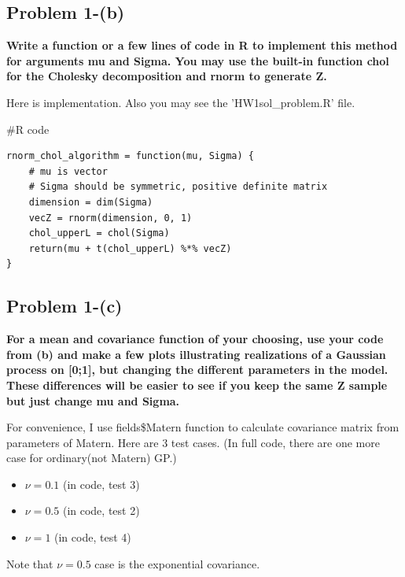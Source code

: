 \documentclass{article}
\newenvironment{Rcode}%
{%
    \begin{mdframed}
    \#R code
    \begin{small}
}
{%
    \end{small}
    \end{mdframed}
}
\begin{document}
\subsection{Problem 1-(b)}
\textbf{
Write a function or a few lines of code in R to implement this method
for arguments mu and Sigma. You may use the built-in function chol for the Cholesky decomposition and rnorm to generate Z.
}

Here is implementation. 
Also you may see the 'HW1sol\_problem.R' file.

\begin{Rcode}
    \begin{verbatim}
rnorm_chol_algorithm = function(mu, Sigma) {
    # mu is vector
    # Sigma should be symmetric, positive definite matrix
    dimension = dim(Sigma)
    vecZ = rnorm(dimension, 0, 1)
    chol_upperL = chol(Sigma)
    return(mu + t(chol_upperL) %*% vecZ)    
}
    \end{verbatim}
\end{Rcode}



\subsection{Problem 1-(c)}
\textbf{
For a mean and covariance function of your choosing, use your code from (b) and
make a few plots illustrating realizations of a Gaussian process on [0;1], but changing the different parameters in the model.
These differences will be easier to see if you keep the same Z sample but just change mu and Sigma.
}

For convenience, I use fields\$Matern function to calculate covariance matrix from parameters of Matern.
Here are 3 test cases. (In full code, there are one more case for ordinary(not Matern) GP.)
\begin{itemize}
    \item $\nu = 0.1$ (in code, test 3)
    \item $\nu = 0.5$ (in code, test 2)
    \item $\nu = 1$ (in code, test 4)
\end{itemize}
Note that $\nu = 0.5$ case is the exponential covariance.
\end{document}
